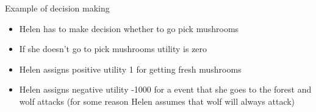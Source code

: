 \documentclass[t]{beamer}
\begin{document}
\begin{frame}

{\Large\color{navyblue} Example of decision making}

  \begin{itemize}
  \item<+-> Helen has to make decision whether to go pick mushrooms
  \item<+-> If she doesn't go to pick mushrooms utility is zero
  \item<+-> Helen assigns positive utility 1 for getting fresh mushrooms
  \item<+-> Helen assigns negative utility -1000 for a event that she goes to the forest and wolf attacks (for some reason Helen assumes that wolf will always attack)\\
    \vspace{\baselineskip}
    ~\\
    \vspace{\baselineskip}
  \end{itemize}

\end{frame}
\end{document}
